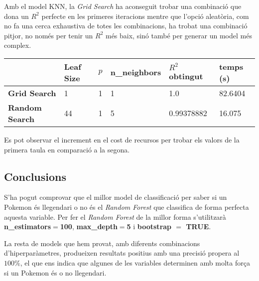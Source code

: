 \documentclass[a4paper, 11pt]{article}
\begin{document}
        Amb el model KNN, la \textit{Grid Search} ha aconseguit trobar una combinació que dona un $R^2$ perfecte en les primeres iteracions mentre que l'opció aleatòria, com no fa una cerca exhaustiva de totes les combinacions, ha trobat una combinació pitjor, no només per tenir un $R^2$ més baix, sinó també per generar un model més complex.
        \begin{table}[H]
            \centering
            \begin{tabular}{|l|l|l|l|l|l|}
            \hline
            \textbf{}              & \textbf{Leaf Size} & \textbf{$p$} & \textbf{n\_neighbors} & \textbf{$R^2$ obtingut} & \textbf{temps (s) } \\ \hline
            \textbf{Grid Search}   & 1                  & 1            & 1                     & 1.0              & 82.6404        \\ \hline
            \textbf{Random Search} & 44                 & 1            & 5                     & 0.99378882       & 16.075          \\ \hline
            \end{tabular}
        \end{table}

        Es pot observar el increment en el cost de recursos per trobar els valors de la primera taula en comparació a la segona.

        \subsection{Conclusions}

        S'ha pogut comprovar que el millor model de classificació per saber si un Pokemon és llegendari o no és el \textit{Random Forest}
        que classifica de forma perfecta aquesta variable. Per fer el \textit{Random Forest} de la millor forma s'utilitzarà \textbf{n\_estimators$=$100}, \textbf{max\_depth$=$5} i \textbf{bootstrap $=$ TRUE}.

        La resta de models que hem provat, amb diferents combinacions d'hiperparàmetres, produeixen resultats positius amb una precisió propera al $100\%$, el que ens indica que algunes de les variables determinen amb molta força si un Pokemon és o no llegendari.
\end{document}
